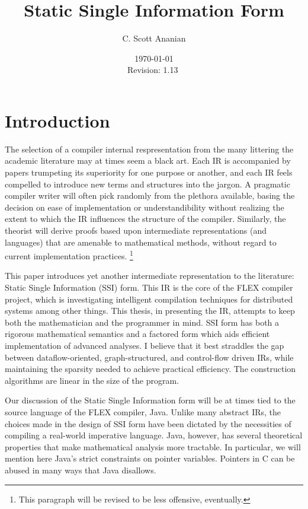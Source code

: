 \documentclass[12pt,notitlepage,twoside]{article}
\title{Static Single Information Form}
\author{C. Scott Ananian}
\date{\today \\ $ $Revision: 1.13 $ $}
\begin{document}
\pagestyle{myheadings}


\maketitle

\section{Introduction}
The selection of a compiler internal respresentation from the many
littering the academic literature may at times seem a black art.  Each
IR is accompanied by papers trumpeting its superiority for one purpose
or another, and each IR feels compelled to introduce new terms and
structures into the jargon.  A pragmatic compiler writer will often
pick randomly from the plethora available, basing the decision on ease
of implementation or understandibility without realizing the extent to
which the IR influences the structure of the compiler.  Similarly, the
theorist will derive proofs based upon intermediate representations
(and languages) that are amenable to mathematical methods, without
regard to current implementation practices.%
\footnote{This paragraph will be revised to be less offensive, eventually.}

This paper introduces yet another intermediate
representation to the literature:  Static Single Information (SSI) form.
This IR is the core of the FLEX compiler project, which is
investigating intelligent compilation techniques for distributed
systems among other things.  This thesis, in presenting the IR,
attempts to keep both the mathematician and the programmer in mind.  
SSI form has both a rigorous mathematical semantics and a factored
form which aids efficient implementation of advanced analyses.
I believe that it best straddles the gap between dataflow-oriented,
graph-structured, and control-flow driven IRs, while maintaining the
sparsity needed to achieve practical efficiency.  The construction
algorithms are linear in the size of the program.

Our discussion of the Static Single Information form will be at times
tied to the source language of the FLEX compiler, Java.  Unlike many
abstract IRs, the choices made in the design of SSI form have been
dictated by the necessities of compiling a real-world imperative
language.  Java, however, has several theoretical properties that make
mathematical analysis more tractable.  In particular, we
will mention here Java's strict constraints on pointer variables.
Pointers in C can be abused in many ways that Java disallows.
\end{document}
